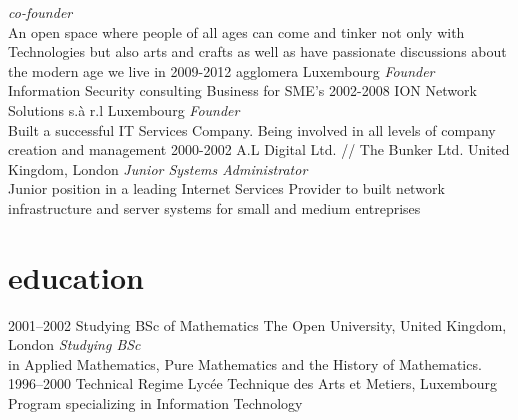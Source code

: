 \documentclass[]{friggeri-cv} %
\begin{document}
\begin{entrylist}
{\emph{co-founder} \\
An open space where people of all ages can come and tinker not only with Technologies but also arts and crafts as well as have passionate discussions about the modern age we live in}
\entry
{2009-2012}
{agglomera}
{Luxembourg}
{\emph{Founder} \\
Information Security consulting Business for SME's}
\entry
{2002-2008}
{ION Network Solutions s.\`{a} r.l}
{Luxembourg}
{\emph{Founder} \\
Built a successful IT Services Company. Being involved in all levels of company creation and management}
\entry
{2000-2002}
{A.L Digital Ltd. // The Bunker Ltd.}
{United Kingdom, London}
{\emph{Junior Systems Administrator} \\
Junior position in a leading Internet Services Provider to built network infrastructure and server systems for small and medium entreprises}
\end{entrylist}

\newpage


\section{education}
\begin{entrylist}
\entry
{2001--2002}
{Studying BSc {\normalfont of Mathematics}}
{The Open University, United Kingdom, London}
{\emph{Studying BSc} \\ in Applied Mathematics, Pure Mathematics and the History of Mathematics.}
\entry
{1996--2000}
{Technical Regime}
{Lyc\'{e}e Technique des Arts et Metiers, Luxembourg}
{Program specializing in Information Technology}
\end{entrylist}



\end{document}
